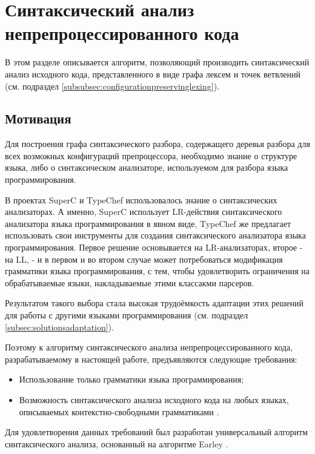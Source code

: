 \clearpage

\section{Синтаксический анализ непрепроцессированного кода}

В этом разделе описывается алгоритм, позволяющий производить синтаксический анализ исходного кода, представленного в виде графа лексем и точек ветвлений (см. подраздел \ref{subsubsec:configurationpreservinglexing}).

\subsection{Мотивация}

Для построения графа синтаксического разбора, содержащего деревья разбора для всех возможных конфигураций препроцессора, необходимо знание о структуре языка, либо о синтаксическом анализаторе, используемом для разбора языка программирования.

В проектах SuperC и TypeChef использовалось знание о синтаксических анализаторах. А именно, SuperC использует LR-действия синтаксического анализатора языка программирования в явном виде, TypeChef же предлагает использовать свои инструменты для создания синтаксического анализатора языка программирования. Первое решение основывается на LR-анализаторах, второе - на LL, - и в первом и во втором случае может потребоваться модификация грамматики языка программирования, с тем, чтобы удовлетворить ограничения на обрабатываемые языки, накладываемые этими классакми парсеров.

Результатом такого выбора стала высокая трудоёмкость адаптации этих решений для работы с другими языками программирования (см. подраздел \ref{subsec:solutionsadaptation}).

Поэтому к алгоритму синтаксического анализа непрепроцессированного кода, разрабатываемому в настоящей работе, предъявляются следующие требования:

\begin{itemize}
\item Использование только грамматики языка программирования;
\item Возможность синтаксического анализа исходного кода на любых языках, описываемых контекстно-свободными грамматиками \cite{cfg}.
\end{itemize}

Для удовлетворения данных требований был разработан универсальный алгоритм синтаксического анализа, основанный на алгоритме Earley \cite{earley68}.

